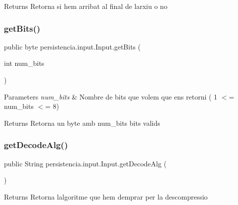 \begin{DoxyReturn}{Returns}
Retorna si hem arribat al final de l\textquotesingle{}arxiu o no 
\end{DoxyReturn}
\mbox{\label{classpersistencia_1_1input_1_1Input_a3fa5a378b2155a3022a4a4ef38d63a8e}} 
\subsubsection{\texorpdfstring{get\+Bits()}{getBits()}}
{\footnotesize\ttfamily public byte persistencia.\+input.\+Input.\+get\+Bits (\begin{DoxyParamCaption}\item[{int}]{num\+\_\+bits }\end{DoxyParamCaption})\hspace{0.3cm}{\ttfamily [inline]}}


\begin{DoxyParams}{Parameters}
{\em num\+\_\+bits} & Nombre de bits que volem que ens retorni ( 1 $<$= num\+\_\+bits $<$= 8) \\
\hline
\end{DoxyParams}
\begin{DoxyReturn}{Returns}
Retorna un byte amb num\+\_\+bits bits valids 
\end{DoxyReturn}
\mbox{\label{classpersistencia_1_1input_1_1Input_a95e2068bd17e415f0487f8193f066160}} 
\subsubsection{\texorpdfstring{get\+Decode\+Alg()}{getDecodeAlg()}}
{\footnotesize\ttfamily public String persistencia.\+input.\+Input.\+get\+Decode\+Alg (\begin{DoxyParamCaption}{ }\end{DoxyParamCaption})\hspace{0.3cm}{\ttfamily [inline]}}

\begin{DoxyReturn}{Returns}
Retorna l\textquotesingle{}algoritme que hem d\textquotesingle{}emprar per la descompressio 
\end{DoxyReturn}
\mbox{\label{classpersistencia_1_1input_1_1Input_a81e96a5ac3ca41b5001ffff9f9acc76a}} 
